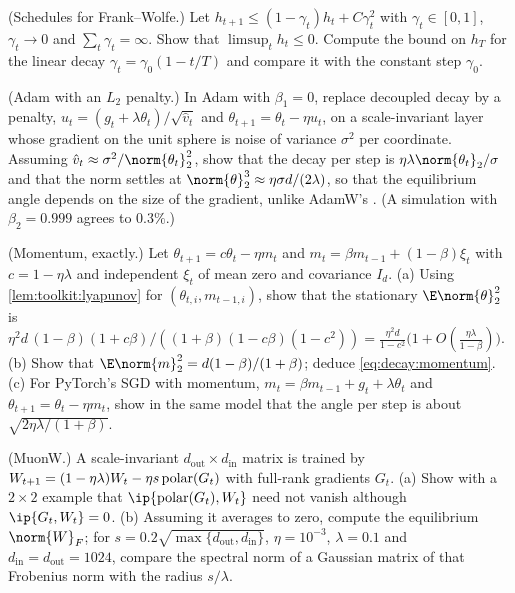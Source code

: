 \begin{refsection}
\begin{exercises}
\item \consolidation (Schedules for Frank--Wolfe.) Let $h_{t+1}\le(1-\gamma_t)h_t+C\gamma_t^2$ with $\gamma_t\in[0,1]$, $\gamma_t\to0$ and $\sum_t\gamma_t=\infty$. Show that $\limsup_th_t\le0$. Compute the bound on $h_T$ for the linear decay $\gamma_t=\gamma_0(1-t/T)$ and compare it with the constant step $\gamma_0$.\label{ex:decay:schedules}

\item \variation (Adam with an $L_2$ penalty.) In Adam with $\beta_1=0$, replace decoupled decay by a penalty, $u_t=(g_t+\lambda\theta_t)/\sqrt{\hat v_t}$ and $\theta_{t+1}=\theta_t-\eta u_t$, on a scale-invariant layer whose gradient on the unit sphere is noise of variance $\sigma^2$ per coordinate. Assuming $\hat v_t\approx\sigma^2/\norm{\theta_t}_2^2$, show that the decay per step is $\eta\lambda\norm{\theta_t}_2/\sigma$ and that the norm settles at $\norm{\theta}_2^3\approx\eta\sigma d/(2\lambda)$, so that the equilibrium angle depends on the size of the gradient, unlike AdamW's \parencite{KossonMessmerJaggi2024}. (A simulation with $\beta_2=0.999$ agrees to $0.3\%$.)\label{ex:decay:l2}

\item \variation (Momentum, exactly.) Let $\theta_{t+1}=c\theta_t-\eta m_t$ and $m_t=\beta m_{t-1}+(1-\beta)\xi_t$ with $c=1-\eta\lambda$ and independent $\xi_t$ of mean zero and covariance $I_d$. (a) Using \cref{lem:toolkit:lyapunov} for $(\theta_{t,i},m_{t-1,i})$, show that the stationary $\E\norm{\theta}_2^2$ is $\eta^2d\,(1-\beta)(1+c\beta)/((1+\beta)(1-c\beta)(1-c^2))=\frac{\eta^2d}{1-c^2}\bigl(1+O(\frac{\eta\lambda}{1-\beta})\bigr)$. (b) Show that $\E\norm{m}_2^2=d(1-\beta)/(1+\beta)$; deduce \eqref{eq:decay:momentum}. (c) For PyTorch's SGD with momentum, $m_t=\beta m_{t-1}+g_t+\lambda\theta_t$ and $\theta_{t+1}=\theta_t-\eta m_t$, show in the same model that the angle per step is about $\sqrt{2\eta\lambda/(1+\beta)}$.\label{ex:decay:momentum}

\item \variation (MuonW.) A scale-invariant $d_{\mathrm{out}}\times d_{\mathrm{in}}$ matrix is trained by $W_{t+1}=(1-\eta\lambda)W_t-\eta s\operatorname{polar}(G_t)$ with full-rank gradients $G_t$. (a) Show with a $2\times2$ example that $\ip{\polar(G_t),W_t}$ need not vanish although $\ip{G_t,W_t}=0$. (b) Assuming it averages to zero, compute the equilibrium $\norm{W}_F$; for $s=0.2\sqrt{\max\{d_{\mathrm{out}},d_{\mathrm{in}}\}}$, $\eta=10^{-3}$, $\lambda=0.1$ and $d_{\mathrm{in}}=d_{\mathrm{out}}=1024$, compare the spectral norm of a Gaussian matrix of that Frobenius norm with the radius $s/\lambda$.\label{ex:decay:muon}


\end{exercises}
\end{refsection}
